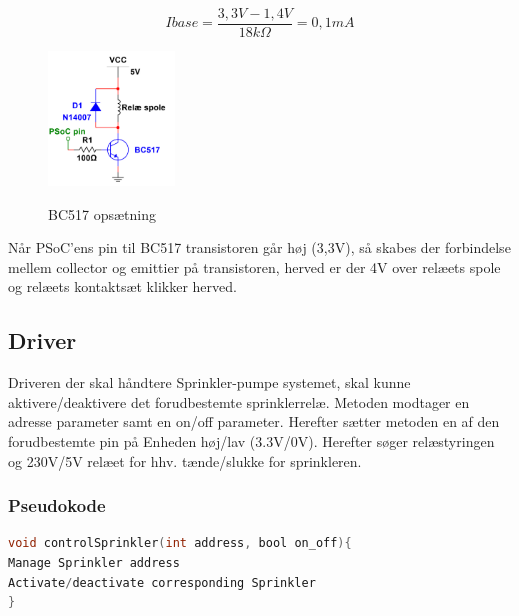 \begin{equation} 
Ibase = \frac{3,3V - 1,4V}{18k\Omega} = 0,1mA
\label{eq:Ibase}
\end{equation}

\begin{figure}[H] \centering
{\includegraphics[width=0.3\textwidth]{filer/design/Billeder/BC517}}
\caption{BC517 opsætning}
\label{lab:BC517}
\raggedright
\end{figure} 

Når PSoC'ens pin til BC517 transistoren går høj (3,3V), så skabes der forbindelse mellem collector og emittier på transistoren, herved er der 4V over relæets spole og relæets kontaktsæt klikker herved. 

\subsection{Driver}

Driveren der skal håndtere Sprinkler-pumpe systemet, skal kunne aktivere/deaktivere det forudbestemte sprinklerrelæ. Metoden modtager en adresse parameter samt en on/off parameter. Herefter sætter metoden en af den forudbestemte pin på Enheden høj/lav (3.3V/0V). Herefter søger relæstyringen og 230V/5V relæet for hhv. tænde/slukke for sprinkleren. 


\subsubsection*{Pseudokode}

\begin{lstlisting}[language=C]
void controlSprinkler(int address, bool on_off){
Manage Sprinkler address
Activate/deactivate corresponding Sprinkler
}
\end{lstlisting}





 